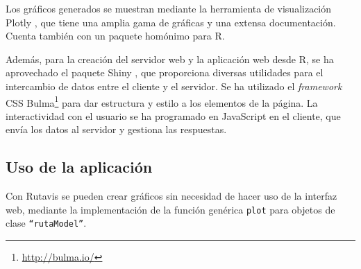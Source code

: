 Los gráficos generados se muestran mediante la herramienta de visualización Plotly \autocite{plotly}, que tiene una amplia gama de gráficas y una extensa documentación. Cuenta también con un paquete homónimo para R.

Además, para la creación del servidor web y la aplicación web desde R, se ha aprovechado el paquete Shiny \autocite{shiny}, que proporciona diversas utilidades para el intercambio de datos entre el cliente y el servidor. Se ha utilizado el \emph{framework} CSS Bulma\footnote{\url{http://bulma.io/}} para dar estructura y estilo a los elementos de la página. La interactividad con el usuario se ha programado en JavaScript en el cliente, que envía los datos al servidor y gestiona las respuestas.

\subsection{Uso de la aplicación}\label{uso-de-la-aplicaciuxf3n}

Con Rutavis se pueden crear gráficos sin necesidad de hacer uso de la interfaz web, mediante la implementación de la función genérica \texttt{plot} para objetos de clase \texttt{``rutaModel''}.

